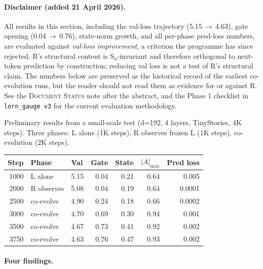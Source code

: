 \documentclass[11pt, a4paper]{article}
\theoremstyle{plain}
\theoremstyle{definition}
\theoremstyle{remark}
\begin{document}
\paragraph{Disclaimer (added 21 April 2026).}
All results in this section, including the val-loss trajectory (5.15\,$\to$\,4.63), gate opening (0.04\,$\to$\,0.76), state-norm growth, and all per-phase pred-loss numbers, are evaluated against \emph{val-loss improvement}, a criterion the programme has since rejected.
R's structural content is S$_n$-invariant and therefore orthogonal to next-token prediction by construction; reducing val loss is not a test of R's structural claim.
The numbers below are preserved as the historical record of the earliest co-evolution runs, but the reader should not read them as evidence for or against R.
See the \textsc{Document Status} note after the abstract, and the Phase 1 checklist in \texttt{lorn\_gauge v3} for the current evaluation methodology.

Preliminary results from a small-scale test (d=192, 4 layers, TinyStories, 4K steps).
Three phases: L alone (1K steps), R observes frozen L (1K steps), co-evolution (2K steps).

\begin{center}\small
\begin{tabular}{rllrrrr}
\toprule
\textbf{Step} & \textbf{Phase} & \textbf{Val} & \textbf{Gate} & \textbf{State} & $|A|_{\max}$ & \textbf{Pred loss} \\
\midrule
1000 & L alone & 5.15 & 0.04 & 0.21 & 0.64 & 0.005 \\
2000 & R observes & 5.08 & 0.04 & 0.19 & 0.64 & 0.0001 \\
2500 & co-evolve & 4.90 & 0.24 & 0.18 & 0.66 & 0.0002 \\
3000 & co-evolve & 4.70 & 0.69 & 0.30 & 0.94 & 0.001 \\
3500 & co-evolve & 4.67 & 0.73 & 0.41 & 0.92 & 0.002 \\
3750 & co-evolve & 4.63 & 0.76 & 0.47 & 0.93 & 0.002 \\
\bottomrule
\end{tabular}
\end{center}

\paragraph{Four findings.}
\end{document}
